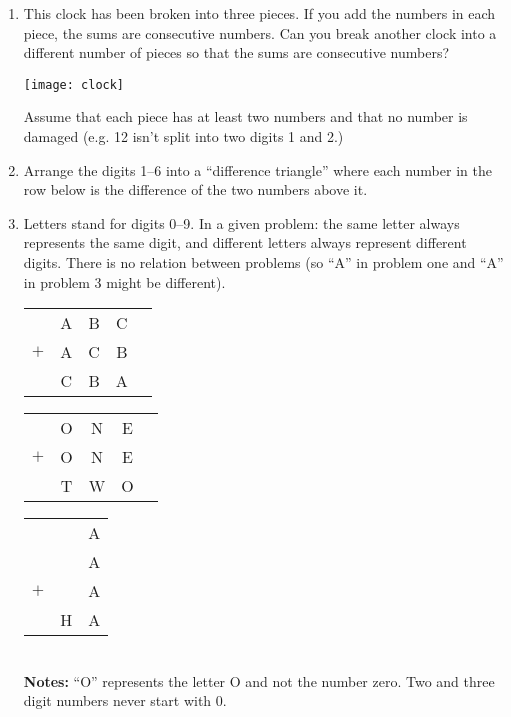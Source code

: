 \begin{enumerate}

\item
 This clock has been broken into three pieces.  If you add the numbers in each piece, the sums are consecutive numbers.  Can you break another clock into a different number of pieces so that the sums are consecutive numbers?  
\begin{center}
\texttt{[image: clock]}
\end{center}
Assume that each piece has at least two numbers and that no number is damaged (e.g. 12 isn't split into two digits 1 and 2.) 




\item
Arrange the digits 1--6 into a ``difference triangle'' where each number in the row below is the difference of the two numbers above it.\\

\item
Letters stand for digits 0--9.  In a given problem: the same letter always represents the same digit, and different letters always represent different digits.  There is no relation between problems (so ``A'' in problem one and ``A'' in problem 3 might be different).

\begin{tabular}{c c c c c }
& A & B & C\\
$+$& A & C & B\\\hline
& C & B & A\\
\end{tabular}
\qquad
\begin{tabular}{c c c c c }
& O & N & E\\
$+$& O & N & E\\\hline
& T & W & O\\
\end{tabular}
\qquad
\begin{tabular}{c c c }
&& A \\
&& A \\
$+$&& A \\\hline
&H& A \\
\end{tabular}\\
{\bf Notes:} ``O'' represents the letter O and not the number zero.  Two and three digit numbers never start with 0.  



\end{enumerate}
